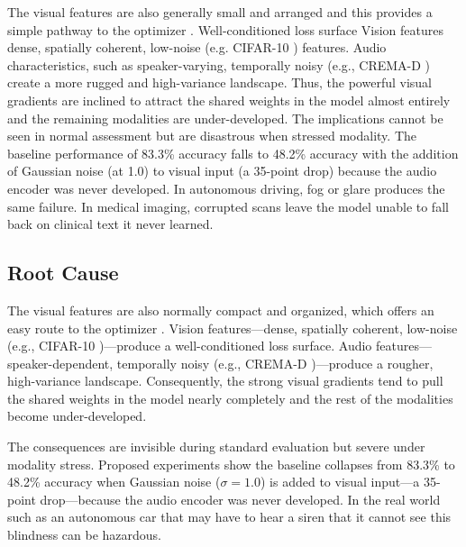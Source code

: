 \documentclass[fleqn,10pt]{wlscirep}
\begin{document}
The visual features are also generally small and arranged and this provides a simple pathway to the optimizer \cite{pezeshki2021gradient}. Well-conditioned loss surface Vision features dense, spatially coherent, low-noise (e.g. CIFAR-10 \cite{krizhevsky2009learning}) features. Audio characteristics, such as speaker-varying, temporally noisy (e.g., CREMA-D \cite{cao2014crema}) create a more rugged and high-variance landscape. Thus, the powerful visual gradients are inclined to attract the shared weights in the model almost entirely and the remaining modalities are under-developed. The implications cannot be seen in normal assessment but are disastrous when stressed modality. The baseline performance of 83.3\% accuracy falls to 48.2\% accuracy with the addition of Gaussian noise (at 1.0) to visual input (a 35-point drop) because the audio encoder was never developed. In autonomous driving, fog or glare produces the same failure. In medical imaging, corrupted scans leave the model unable to fall back on clinical text it never learned.

\subsection*{Root Cause}
The visual features are also normally compact and organized, which offers an easy route to the optimizer \cite{pezeshki2021gradient}. Vision features---dense, spatially coherent, low-noise (e.g., CIFAR-10 \cite{krizhevsky2009learning})---produce a well-conditioned loss surface. Audio features---speaker-dependent, temporally noisy (e.g., CREMA-D \cite{cao2014crema})---produce a rougher, high-variance landscape. Consequently, the strong visual gradients tend to pull the shared weights in the model nearly completely and the rest of the modalities become under-developed.

The consequences are invisible during standard evaluation but severe under modality stress. Proposed experiments show the baseline collapses from 83.3\% to 48.2\% accuracy when Gaussian noise ($\sigma = 1.0$) is added to visual input---a 35-point drop---because the audio encoder was never developed. In the real world such as an autonomous car that may have to hear a siren that it cannot see this blindness can be hazardous.
\end{document}
